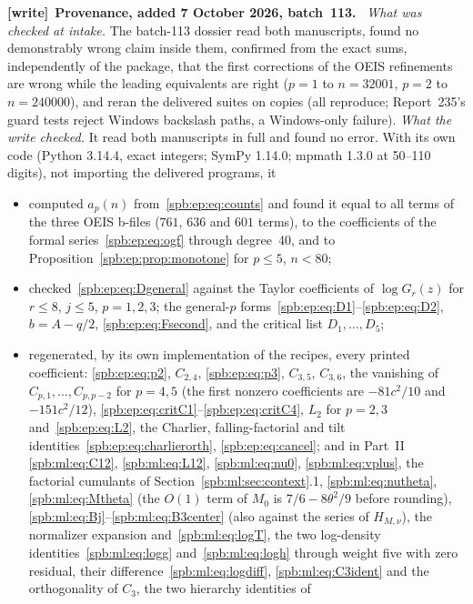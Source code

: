 \documentclass[11pt,letterpaper]{article}
\numberwithin{equation}{section}
\theoremstyle{definition}\newtheorem{definition}[theorem]{Definition}
\theoremstyle{remark}\newtheorem{remark}[theorem]{Remark}
\newcommand{\1}{\mathbf 1}
\newenvironment{writenote}[1][]{\par\smallskip\begingroup\small
 \noindent\textbf{[write]}\if\relax\detokenize{#1}\relax\else~\textbf{#1.}\fi\ }%
 {\par\endgroup\smallskip}
\begin{document}
\begin{writenote}[Provenance, added 7 October 2026, batch~113]
\emph{What was checked at intake.} The batch-113 dossier read both
manuscripts, found no demonstrably wrong claim inside them, confirmed from the
exact sums, independently of the package, that the first corrections of the
OEIS refinements are wrong while the leading equivalents are right ($p=1$ to
$n=32001$, $p=2$ to $n=240000$), and reran the delivered suites on copies (all
reproduce; Report~235's guard tests reject Windows backslash paths, a
Windows-only failure). \emph{What the write checked.} It read both manuscripts
in full and found no error. With its own code (Python 3.14.4, exact integers;
SymPy 1.14.0; mpmath 1.3.0 at 50--110 digits), not importing the delivered
programs, it
\begin{itemize}\raggedright
\item computed $a_p(n)$ from~\eqref{spb:ep:eq:counts} and found it equal to
all terms of the three OEIS b-files ($761$, $636$ and $601$ terms), to the
coefficients of the formal series~\eqref{spb:ep:eq:ogf} through degree~40, and
to Proposition~\ref{spb:ep:prop:monotone} for $p\le5$, $n<80$;
\item checked~\eqref{spb:ep:eq:Dgeneral} against the Taylor coefficients of
$\log G_r(z)$ for $r\le8$, $j\le5$, $p=1,2,3$; the general-$p$
forms~\eqref{spb:ep:eq:D1}--\eqref{spb:ep:eq:D2}, $b=A-q/2$,
\eqref{spb:ep:eq:Fsecond}, and the critical list $D_1,\ldots,D_5$;
\item regenerated, by its own implementation of the recipes, every printed
coefficient: \eqref{spb:ep:eq:p2}, $C_{2,4}$, \eqref{spb:ep:eq:p3}, $C_{3,5}$,
$C_{3,6}$, the vanishing of $C_{p,1},\ldots,C_{p,p-2}$ for $p=4,5$ (the first
nonzero coefficients are $-81c^2/10$ and $-151c^2/12$),
\eqref{spb:ep:eq:critC1}--\eqref{spb:ep:eq:critC4}, $L_2$ for $p=2,3$
and~\eqref{spb:ep:eq:L2}, the Charlier, falling-factorial and tilt
identities~\eqref{spb:ep:eq:charlierorth}, \eqref{spb:ep:eq:cancel}; and in
Part~II \eqref{spb:ml:eq:C12}, \eqref{spb:ml:eq:L12},
\eqref{spb:ml:eq:nu0}, \eqref{spb:ml:eq:vplus}, the factorial cumulants of
Section~\ref{spb:ml:sec:context}.1, \eqref{spb:ml:eq:nutheta},
\eqref{spb:ml:eq:Mtheta} (the $O(1)$ term of $M_0$ is $7/6-8\theta^2/9$ before
rounding), \eqref{spb:ml:eq:Bj}--\eqref{spb:ml:eq:B3center} (also against the
series of $H_{M,\nu}$), the normalizer expansion and~\eqref{spb:ml:eq:logT},
the two log-density identities~\eqref{spb:ml:eq:logg}
and~\eqref{spb:ml:eq:logh} through weight five with zero residual,
their difference~\eqref{spb:ml:eq:logdiff}, \eqref{spb:ml:eq:C3ident} and the
orthogonality of $C_3$, the two hierarchy identities of

\end{itemize}
\end{writenote}
\end{document}

